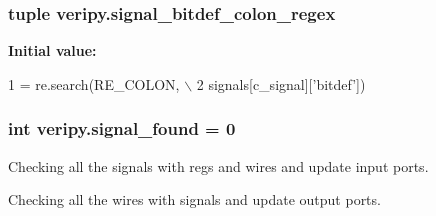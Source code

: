 \hypertarget{namespaceveripy_a4eec11a6d141b0afa891ea1ebd3c48ed}{
\subsubsection[{signal\-\_\-bitdef\-\_\-colon\-\_\-regex}]{\setlength{\rightskip}{0pt plus 5cm}tuple veripy.\-signal\-\_\-bitdef\-\_\-colon\-\_\-regex}}\label{namespaceveripy_a4eec11a6d141b0afa891ea1ebd3c48ed}
{\bfseries Initial value\-:}
\begin{DoxyCode}
1 = re.search(RE\_COLON, \(\backslash\)
2                                                 signals[c\_signal][\textcolor{stringliteral}{'bitdef'}])
\end{DoxyCode}
\hypertarget{namespaceveripy_ad2d051929b4f3a74a076b081dddd2c84}{
\subsubsection[{signal\-\_\-found}]{\setlength{\rightskip}{0pt plus 5cm}int veripy.\-signal\-\_\-found = 0}}\label{namespaceveripy_ad2d051929b4f3a74a076b081dddd2c84}


Checking all the signals with regs and wires and update input ports. 

Checking all the wires with signals and update output ports.

